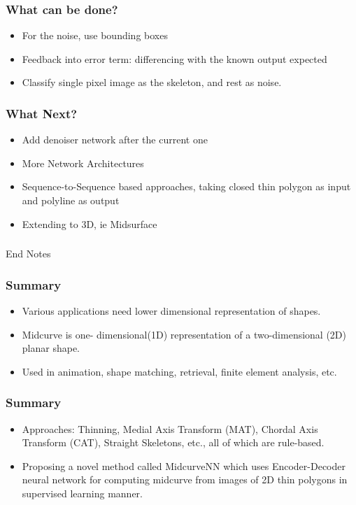 \begin{frame}[fragile]\frametitle{What can be done?}
	\begin{itemize}
	\item For the noise, use bounding boxes 
	\item Feedback into error term: differencing with the known output expected 
	\item Classify single pixel image as the skeleton, and rest as noise. 
	\end{itemize}	
\end{frame}

\begin{frame}[fragile]\frametitle{What Next?}
	\begin{itemize}
	\item Add denoiser network after the current one
	\item More Network Architectures
	\item Sequence-to-Sequence based approaches, taking closed thin polygon as input and polyline as output
	\item Extending to 3D, ie Midsurface
	\end{itemize}	
\end{frame}

\begin{frame}[fragile]\frametitle{}
\begin{center}
{\Large End Notes}
\end{center}
\end{frame}


\begin{frame}[fragile]\frametitle{Summary}
	\begin{itemize}
	\item Various applications need lower dimensional representation of shapes. 
	\item Midcurve is one- dimensional(1D) representation of a two-dimensional (2D) planar shape. 
	\item Used in animation, shape matching, retrieval, finite element analysis, etc. 
	\end{itemize}	
\end{frame}

\begin{frame}[fragile]\frametitle{Summary}
	\begin{itemize}
	\item Approaches: Thinning, Medial Axis Transform (MAT), Chordal Axis Transform (CAT), Straight Skeletons, etc., all of which are rule-based.
	\item Proposing a novel method called MidcurveNN which uses Encoder-Decoder neural network for computing midcurve from images of 2D thin polygons in supervised learning manner. 
	\end{itemize}	
\end{frame}

